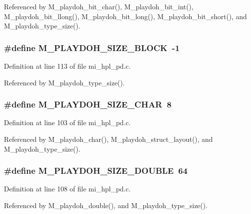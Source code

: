 Referenced by M\_\-playdoh\_\-bit\_\-char(), M\_\-playdoh\_\-bit\_\-int(), M\_\-playdoh\_\-bit\_\-llong(), M\_\-playdoh\_\-bit\_\-long(), M\_\-playdoh\_\-bit\_\-short(), and M\_\-playdoh\_\-type\_\-size().
\subsubsection{\setlength{\rightskip}{0pt plus 5cm}\#define M\_\-PLAYDOH\_\-SIZE\_\-BLOCK~-1}\label{mi__hpl__pd_8c_7a2542d0056fb3a397c077736010cbb4}




Definition at line 113 of file mi\_\-hpl\_\-pd.c.

Referenced by M\_\-playdoh\_\-type\_\-size().
\subsubsection{\setlength{\rightskip}{0pt plus 5cm}\#define M\_\-PLAYDOH\_\-SIZE\_\-CHAR~8}\label{mi__hpl__pd_8c_2d48f3c6f016736b4a42ca096919971b}




Definition at line 103 of file mi\_\-hpl\_\-pd.c.

Referenced by M\_\-playdoh\_\-char(), M\_\-playdoh\_\-struct\_\-layout(), and M\_\-playdoh\_\-type\_\-size().
\subsubsection{\setlength{\rightskip}{0pt plus 5cm}\#define M\_\-PLAYDOH\_\-SIZE\_\-DOUBLE~64}\label{mi__hpl__pd_8c_aa48187ee18408a3320aa9a13a3ea235}




Definition at line 108 of file mi\_\-hpl\_\-pd.c.

Referenced by M\_\-playdoh\_\-double(), and M\_\-playdoh\_\-type\_\-size().
